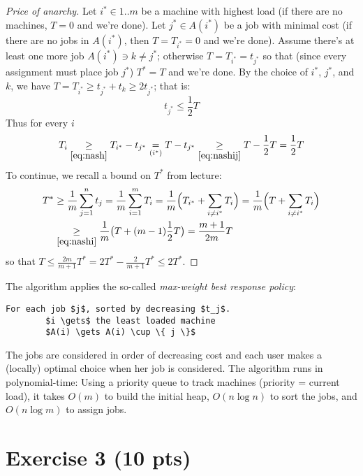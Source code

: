 \documentclass[a4paper]{article}
\begin{document}
\begin{proof}[Price of anarchy]
	Let $i^\ast \in 1..m$ be a machine with highest load (if there are no machines, $T = 0$ and we're done).
	Let $j^\ast \in A(i^\ast)$ be a job with minimal cost (if there are no jobs in $A(i^\ast)$, then $T = T_{i^\ast} = 0$ and we're done).
	Assume there's at least one more job $A(i^\ast) \ni k \not= j^\ast$; otherwise $T = T_{i^\ast} = t_{j^\ast}$ so that (since every assignment must place job $j^\ast$) $T^\ast = T$ and we're done.
	By the choice of $i^\ast$, $j^\ast$, and $k$, we have $T = T_{i^\ast} \ge t_{j^\ast} + t_k \ge 2t_{j^\ast}$; that is:
	\begin{equation}\label{eq:nashij}
		t_{j^\ast} \le \frac{1}{2}T
	\end{equation}
	Thus for every $i$
	\begin{equation}\label{eq:nashi}
		T_i \underset{\eqref{eq:nash}}{\ge} T_{i^\ast} - t_{j^\ast} \underset{(i^\ast)}{=} T - t_{j^\ast} \underset{\eqref{eq:nashij}}{\ge} T - \frac{1}{2}T = \frac{1}{2}T
	\end{equation}
	To continue, we recall a bound on $T^\ast$ from lecture:
	\begin{align*}
		T^\ast &\ge \frac{1}{m} \sum_{j=1}^n t_j = \frac{1}{m} \sum_{i=1}^m T_i = \frac{1}{m} \Bigl(T_{i^\ast} + \sum_{i \not= i^\ast} T_i\Bigr) = \frac{1}{m} \Bigl(T + \sum_{i \not= i^\ast} T_i\Bigr)\\
		&\underset{\eqref{eq:nashi}}{\ge} \frac{1}{m} \bigl(T + (m-1)\frac{1}{2} T\bigr) = \frac{m+1}{2m} T
	\end{align*}
	so that $T \le \frac{2m}{m+1} T^\ast = 2T^\ast - \frac{2}{m+1}T^\ast \le 2T^\ast$.
\end{proof}

The algorithm applies the so-called \emph{max-weight best response policy}:
\begin{lstlisting}[mathescape]
	For each job $j$, sorted by decreasing $t_j$.
		$i \gets$ the least loaded machine
		$A(i) \gets A(i) \cup \{ j \}$
\end{lstlisting}
The jobs are considered in order of decreasing cost and each user makes a (locally) optimal choice when her job is considered.
The algorithm runs in polynomial-time: Using a priority queue to track machines (priority = current load), it takes $O(m)$ to build the initial heap, $O(n \log n)$ to sort the jobs, and $O(n \log m)$ to assign jobs.

\section*{Exercise 3 (10 pts)}
\end{document}
